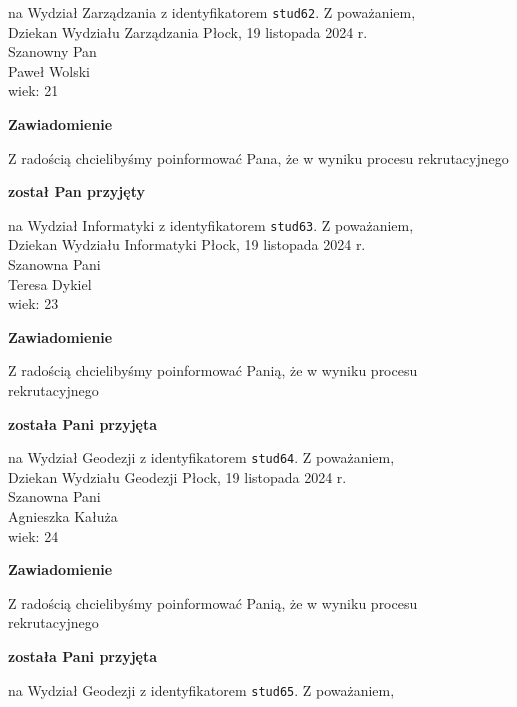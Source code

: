 \documentclass[12pt,a4paper]{article}
\begin{document}
na Wydział Zarządzania z identyfikatorem \verb|stud62|. 
\vspace{2cm}
\noindent
Z poważaniem, \\
Dziekan
Wydziału Zarządzania
\newpage
\hfill Płock, 19 listopada 2024 r. \\
\noindent
Szanowny Pan \\
Paweł Wolski \\
wiek: 21
\bigskip
\begin{center}
    {\Large\textbf{Zawiadomienie}}
\end{center}
\bigskip 
Z radością chcielibyśmy poinformować Pana, że w wyniku procesu rekrutacyjnego
\begin{center}
\textsf{\textbf{został Pan przyjęty}}
\end{center}
na Wydział Informatyki z identyfikatorem \verb|stud63|. 
\vspace{2cm}
\noindent
Z poważaniem, \\
Dziekan
Wydziału Informatyki
\newpage
\hfill Płock, 19 listopada 2024 r. \\
\noindent
Szanowna Pani \\
Teresa Dykiel \\
wiek: 23
\bigskip
\begin{center}
    {\Large\textbf{Zawiadomienie}}
\end{center}
\bigskip 
Z radością chcielibyśmy poinformować Panią, że w wyniku procesu rekrutacyjnego
\begin{center}
\textsf{\textbf{została Pani przyjęta}}
\end{center}
na Wydział Geodezji z identyfikatorem \verb|stud64|. 
\vspace{2cm}
\noindent
Z poważaniem, \\
Dziekan
Wydziału Geodezji
\newpage
\hfill Płock, 19 listopada 2024 r. \\
\noindent
Szanowna Pani \\
Agnieszka Kałuża \\
wiek: 24
\bigskip
\begin{center}
    {\Large\textbf{Zawiadomienie}}
\end{center}
\bigskip 
Z radością chcielibyśmy poinformować Panią, że w wyniku procesu rekrutacyjnego
\begin{center}
\textsf{\textbf{została Pani przyjęta}}
\end{center}
na Wydział Geodezji z identyfikatorem \verb|stud65|. 
\vspace{2cm}
\noindent
Z poważaniem, \\
\end{document}
